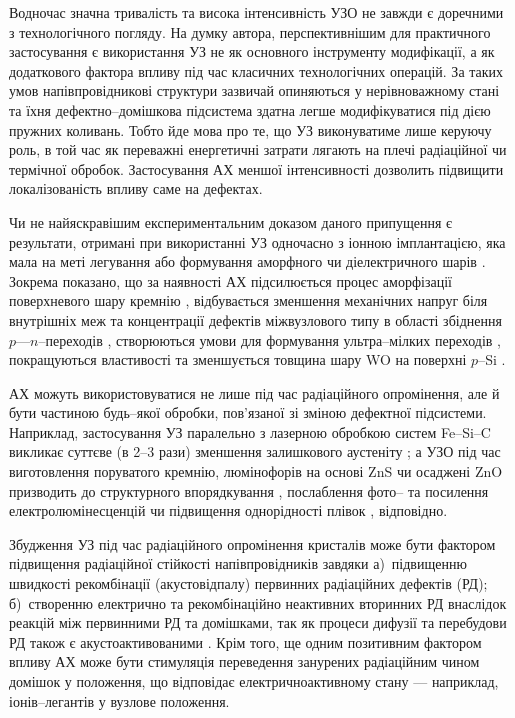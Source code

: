 Водночас значна тривалість та висока інтенсивність УЗО не завжди є доречними з технологічного погляду.
На думку автора, перспективнішим для практичного застосування є використання УЗ не як основного інструменту модифікації, а як додаткового фактора впливу під час класичних технологічних операцій.
За таких умов напівпровідникові структури зазвичай опиняються у нерівноважному стані та їхня дефектно--домішкова підсистема здатна легше модифікуватися під дією пружних коливань.
Тобто йде мова про те, що УЗ виконуватиме лише керуючу роль, в той час як переважні енергетичні затрати
лягають на плечі радіаційної чи термічної обробок.
Застосування  АХ  меншої інтенсивності дозволить підвищити локалізованість впливу саме на дефектах.

Чи не найяскравішим експериментальним доказом даного припущення є результати, отримані при
використанні УЗ одночасно з іонною імплантацією, яка мала на меті легування або формування аморфного чи діелектричного шарів \cite{US:ImplantUFJ2015,US:ImplantUFJ2001,US:ImplantUFJ2008,ROMANYUK2005,Roman2006,RomanyukSST,
YOlikh2005,ROMANJUK2005MatSci,USImplant:JVacSci}.
Зокрема показано, що за наявності АХ
підсилюється процес аморфізації поверхневого шару кремнію \cite{RomanyukSST,US:ImplantUFJ2001},
відбувається зменшення механічних напруг біля внутрішніх меж \cite{US:ImplantUFJ2008,ROMANJUK2005MatSci}
та концентрації дефектів міжвузлового типу в області збіднення $p$---$n$--переходів \cite{YOlikh2005},
створюються умови для формування ультра--мілких переходів \cite{USImplant:JVacSci},
покращуються властивості та зменшується товщина шару WO на поверхні $p$--Si \cite{ROMANYUK2005,Roman2006}.

АХ можуть використовуватися не лише під час радіаційного опромінення, але й бути частиною будь--якої обробки, пов'язаної зі зміною дефектної підсистеми.
Наприклад, застосування УЗ паралельно з лазерною обробкою систем Fe--Si--C викликає суттєве (в 2--3 рази) зменшення залишкового аустеніту \cite{US:FeSiC};
а УЗО під час виготовлення поруватого кремнію, люмінофорів на основі ZnS чи осаджені ZnO призводить до структурного впорядкування \cite{Kalem2000}, послаблення фото-- та посилення електролюмінесценцій \cite{Wang:JLum} чи підвищення однорідності плівок \cite{US:ZnOfilm}, відповідно.



Збудження УЗ під час радіаційного опромінення кристалів може бути фактором підвищення радіаційної стійкості напівпровідників завдяки
а)~підвищенню швидкості рекомбінації (акустовідпалу) первинних радіаційних дефектів (РД);
б)~створенню електрично та рекомбінаційно неактивних вторинних РД внаслідок реакцій між первинними РД та домішками, так як процеси дифузії та перебудови РД також є акустоактивованими \cite{YOlikh2006TPLr,Parchinskii2000r}.
Крім того, ще одним позитивним фактором впливу АХ може бути стимуляція переведення занурених радіаційним чином домішок у положення, що відповідає електричноактивному стану --- наприклад, іонів--легантів у вузлове положення.


